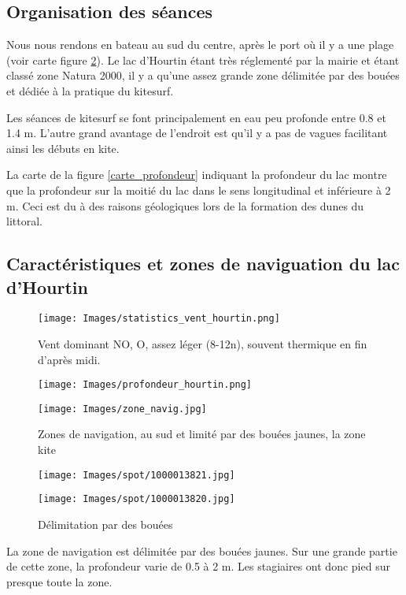 \documentclass[11pt,a4paper]{report}
\begin{document}
\subsection{Organisation des séances}
Nous nous rendons en bateau au sud du centre, après le port o\`u il y a 
une plage (voir carte figure \ref{zones_nav}). Le lac d'Hourtin étant très 
réglementé par la mairie et étant classé zone Natura 2000\cite{natura2000}, 
il y a qu'une assez grande zone délimitée par des bouées et dédiée à la pratique
du kitesurf.

Les séances de kitesurf se font principalement en eau peu profonde entre 0.8 et 1.4 m.
L'autre grand avantage de l'endroit est qu'il y a pas de vagues facilitant ainsi
les débuts en kite.

La carte de la figure \ref{carte_profondeur} indiquant la profondeur du lac
montre que la profondeur sur la moitié du lac dans le sens longitudinal 
et inférieure à 2 m. Ceci est du à des raisons géologiques lors de la
formation des dunes du littoral.

\subsection{Caractéristiques  et zones de naviguation du lac d'Hourtin}
\begin{figure}
\centering
\texttt{[image: Images/statistics\_vent\_hourtin.png]} 
\caption{Vent dominant NO, O, assez léger (8-12n), 
souvent thermique en fin d'après midi.\label{vent_stats}}
\end{figure}

\begin{figure}
\begin{minipage}{0.4\textwidth}
\texttt{[image: Images/profondeur\_hourtin.png]} 
\caption{Profondeur du lac d'Hourtin, la profondeur est inférieure
à 2m sur la moitié est du lac (limite 2 m en vert)\label{carte_profondeur}}
\end{minipage}
\hfill
\begin{minipage}{0.4\textwidth}
\texttt{[image: Images/zone\_navig.jpg]} 
\caption{Zones de navigation, au sud et limité par des bouées jaunes,
 la zone kite\label{zones_nav}}
 \end{minipage}
\end{figure}

\begin{figure}
\begin{minipage}{0.4\textwidth}
\texttt{[image: Images/spot/1000013821.jpg]} 
\caption{Zone de pratique}
\end{minipage}
\hfill
\begin{minipage}{0.4\textwidth}
\texttt{[image: Images/spot/1000013820.jpg]} 
\caption{Délimitation par des bouées}
\end{minipage}
\end{figure}
La zone de navigation est délimitée par des bouées jaunes.
Sur une grande partie de cette zone, la profondeur varie de 0.5 à 2 m.
Les stagiaires ont donc pied sur presque toute la zone.
\end{document}
